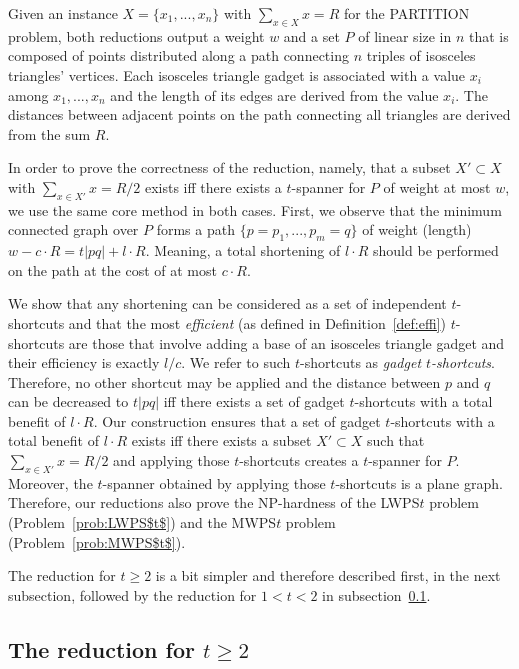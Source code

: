 \documentclass[a4paper]{llncs}
\begin{document}
Given an instance $X=\{x_1,...,x_n\}$ with $\sum_{x \in X} x =R$ for the PARTITION problem,
both reductions output a weight $w$ and a set $P$ of linear size in $n$ 
that is composed of points distributed along a path 
connecting $n$ triples of isosceles triangles' vertices.
Each isosceles triangle gadget is associated with a value $x_i$ among $x_1,...,x_n$
and the length of its edges are derived from the value $x_i$. 
The distances between adjacent points on the path connecting all triangles
are derived from the sum $R$.

In order to prove the correctness of the reduction, namely, 
that a subset $X'\subset X$ with $\sum_{x \in X'} x =R/2$ exists 
iff there exists a $t$-spanner for $P$ of weight at most $w$, 
we use the same core method in both cases.
First, we observe that the minimum connected graph over $P$ forms a path
$\{p=p_1,...,p_m=q\}$ of weight (length) $w-c \cdot R= t|pq| + l \cdot R$. 
Meaning, a total shortening of $l \cdot R$ should be performed on the path
at the cost of at most $c\cdot R$.

We show that any shortening can be considered as a set of independent $t$-shortcuts
and that the most \emph{efficient} (as defined in Definition~\ref{def:effi}) 
$t$-shortcuts are those that involve adding a base of
an isosceles triangle gadget and their efficiency is exactly $l/c$.
We refer to such $t$-shortcuts as \emph{gadget $t$-shortcuts}.
Therefore, no other shortcut may be applied and 
the distance between $p$ and $q$ can be decreased to $t|pq|$ iff there  
exists a set of gadget $t$-shortcuts with a total benefit of $l\cdot R$.
Our construction ensures that a set of gadget $t$-shortcuts 
with a total benefit of $l\cdot R$ exists iff
there exists a subset $X'\subset X$ such that $\sum_{x \in X'} x =R/2$
and applying those $t$-shortcuts creates a $t$-spanner for $P$.
Moreover, the $t$-spanner obtained by applying those $t$-shortcuts is a plane graph.
Therefore, our reductions also prove the NP-hardness of the LWPS$t$ problem (Problem~\ref{prob:LWPS$t$})
and the MWPS$t$ problem (Problem~\ref{prob:MWPS$t$}).

The reduction for $t \geq 2$ is a bit simpler and therefore 
described first, in the next subsection,
followed by the reduction for $1<t< 2$ in subsection~\ref{subsec:t>2}.




\subsection{The reduction for $t \geq 2$}\label{subsec:t>2}
\end{document}
